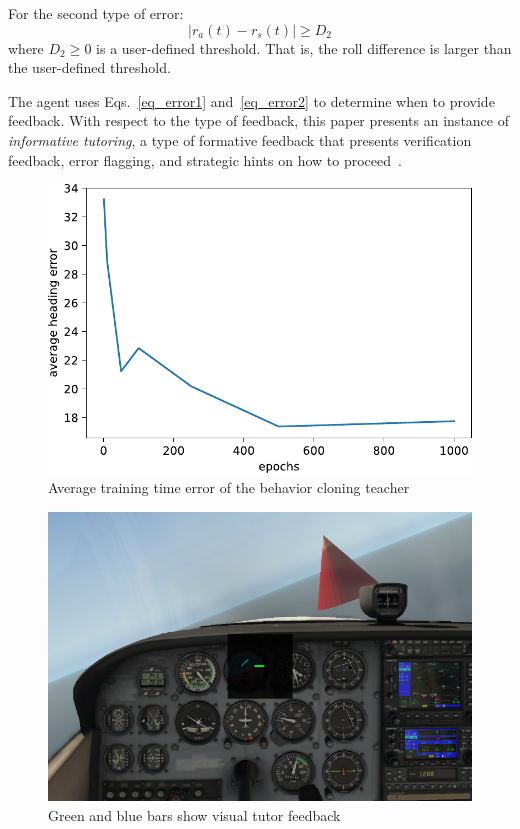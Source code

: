 \documentclass[letterpaper]{article}
\begin{document}
For the second type of error:
\begin{equation}
    |r_a(t) - r_s(t)| \ge D_2
    \label{eq_error2}
\end{equation}
where $D_2 \ge 0$ is a user-defined threshold. That is, the roll difference is larger than the user-defined threshold.

The agent uses Eqs.~\ref{eq_error1} and~\ref{eq_error2} to determine when to provide feedback. With respect to the type of feedback, this paper presents an instance of \emph{informative tutoring}, a type of formative feedback that presents verification feedback, error flagging, and strategic hints on how to proceed~\citep{shute:08}.
\begin{figure}[t]
	\begin{minipage}{1\linewidth}
		\centering \small
		\includegraphics[width=\textwidth]{img/evaluation.pdf}
		\caption{Average training time error of the behavior cloning teacher}
		\label{fig:evaluate}
	\end{minipage}
\end{figure}
\begin{figure}[t]
	\begin{minipage}{1\linewidth}
		\centering \small
		\includegraphics[width=\textwidth]{img/feedback.pdf}
		\caption{Green and blue bars show visual tutor feedback}
		\label{fig:feedback}
	\end{minipage}
\end{figure}
\end{document}
